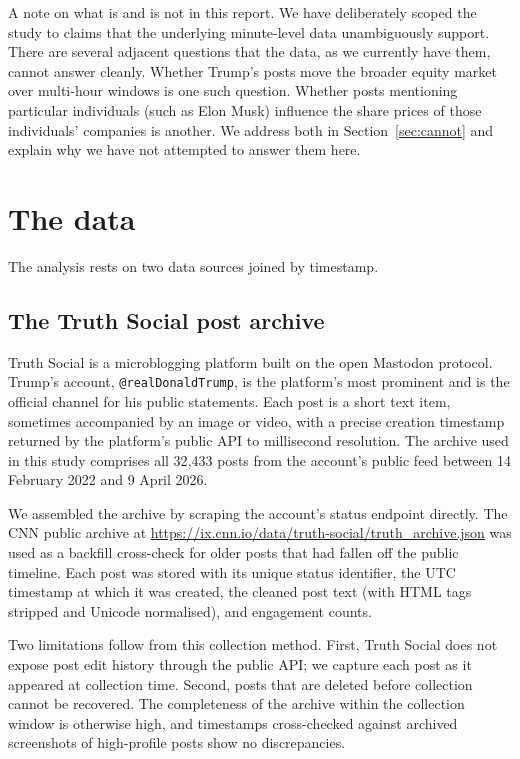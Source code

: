 \documentclass[11pt,a4paper]{article}
\begin{document}
A note on what is and is not in this report. We have deliberately scoped the study to claims that the underlying minute-level data unambiguously support. There are several adjacent questions that the data, as we currently have them, cannot answer cleanly. Whether Trump's posts move the broader equity market over multi-hour windows is one such question. Whether posts mentioning particular individuals (such as Elon Musk) influence the share prices of those individuals' companies is another. We address both in Section~\ref{sec:cannot} and explain why we have not attempted to answer them here.

\section{The data}\label{sec:data}

The analysis rests on two data sources joined by timestamp.

\subsection{The Truth Social post archive}

Truth Social is a microblogging platform built on the open Mastodon protocol. Trump's account, \texttt{@realDonaldTrump}, is the platform's most prominent and is the official channel for his public statements. Each post is a short text item, sometimes accompanied by an image or video, with a precise creation timestamp returned by the platform's public API to millisecond resolution. The archive used in this study comprises all 32{,}433 posts from the account's public feed between 14 February 2022 and 9 April 2026.

We assembled the archive by scraping the account's status endpoint directly. The CNN public archive at \url{https://ix.cnn.io/data/truth-social/truth_archive.json} was used as a backfill cross-check for older posts that had fallen off the public timeline. Each post was stored with its unique status identifier, the UTC timestamp at which it was created, the cleaned post text (with HTML tags stripped and Unicode normalised), and engagement counts.

Two limitations follow from this collection method. First, Truth Social does not expose post edit history through the public API; we capture each post as it appeared at collection time. Second, posts that are deleted before collection cannot be recovered. The completeness of the archive within the collection window is otherwise high, and timestamps cross-checked against archived screenshots of high-profile posts show no discrepancies.
\end{document}

